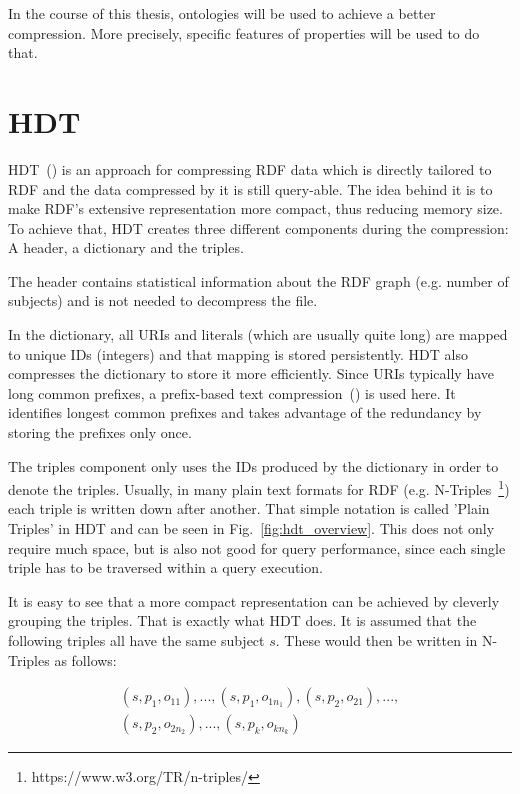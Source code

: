 In the course of this thesis, ontologies will be used to achieve a better compression. More precisely, specific features of properties will be used to do that.

\section{HDT}\label{related_work_hdt}

HDT~(\cite{hdt}) is an approach for compressing RDF data which is directly tailored to RDF and the data compressed by it is still query-able. The idea behind it is to make RDF's extensive representation more compact, thus reducing memory size. To achieve that, HDT creates three different components during the compression: A header, a dictionary and the triples.

The header contains statistical information about the RDF graph (e.g. number of subjects) and is not needed to decompress the file.

In the dictionary, all URIs and literals (which are usually quite long) are mapped to unique IDs (integers) and that mapping is stored persistently. HDT also compresses the dictionary to store it more efficiently. Since URIs typically have long common prefixes, a prefix-based text compression~(\cite{ppm}) is used here. It identifies longest common prefixes and takes advantage of the redundancy by storing the prefixes only once.

The triples component only uses the IDs produced by the dictionary in order to denote the triples. Usually, in many plain text formats for RDF (e.g. N-Triples~\footnote{https://www.w3.org/TR/n-triples/}) each triple is written down after another. That simple notation is called 'Plain Triples' in HDT and can be seen in Fig.~\ref{fig:hdt_overview}. This does not only require much space, but is also not good for query performance, since each single triple has to be traversed within a query execution.

It is easy to see that a more compact representation can be achieved by cleverly grouping the triples. That is exactly what HDT does. It is assumed that the following triples all have the same subject $s$. These would then be written in N-Triples as follows:

\begin{align*}
(s,p_1,o_{11}),...,(s,p_1,o_{1n_1}),(s,p_2,o_{21}),...,\\
	(s,p_2,o_{2n_2}),...,(s,p_k,o_{kn_k})
\end{align*}

